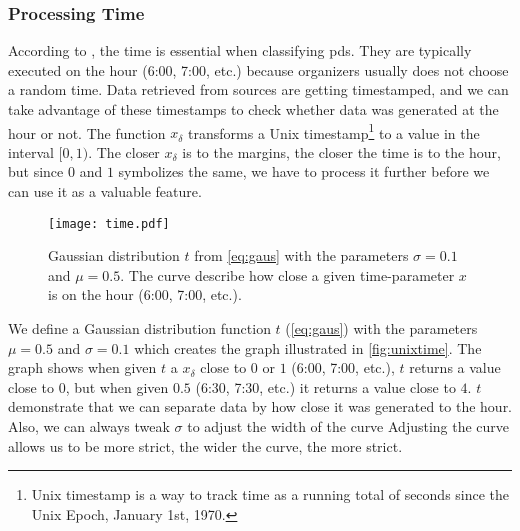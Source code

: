 \subsubsection{Processing Time}
According to \cite{P&D_anatomy}, the time is essential when classifying \acp{pd}. They are typically executed on the hour (6:00, 7:00, etc.) because organizers usually does not choose a random time. Data retrieved from sources are getting timestamped, and we can take advantage of these timestamps to check whether data was generated at the hour or not. The function $x_\delta$ transforms a Unix timestamp\footnote{Unix timestamp is a way to track time as a running total of seconds since the Unix Epoch, January 1st, 1970.} to a value in the interval $[0, 1)$. The closer $x_\delta$ is to the margins, the closer the time is to the hour, but since $0$ and $1$ symbolizes the same, we have to process it further before we can use it as a valuable feature.

\begin{figure}
    \centering
    \texttt{[image: time.pdf]}
    \caption[\project's time curve]{Gaussian distribution $t$ from \autoref{eq:gaus} with the parameters $\sigma=0.1$ and $\mu=0.5$. The curve describe how close a given time-parameter $x$ is on the hour (6:00, 7:00, etc.).}
    \label{fig:unixtime}
\end{figure}



We define a Gaussian distribution function $t$ (\autoref{eq:gaus}) with the parameters $\mu=0.5$ and $\sigma=0.1$ which creates the graph illustrated in \autoref{fig:unixtime}. The graph shows when given $t$ a $x_\delta$ close to $0$ or $1$ (6:00, 7:00, etc.), $t$ returns a value close to $0$, but when given $0.5$ (6:30, 7:30, etc.) it returns a value close to $4$. $t$ demonstrate that we can separate data by how close it was generated to the hour. Also, we can always tweak $\sigma$ to adjust the width of the curve Adjusting the curve allows us to be more strict, the wider the curve, the more strict.

